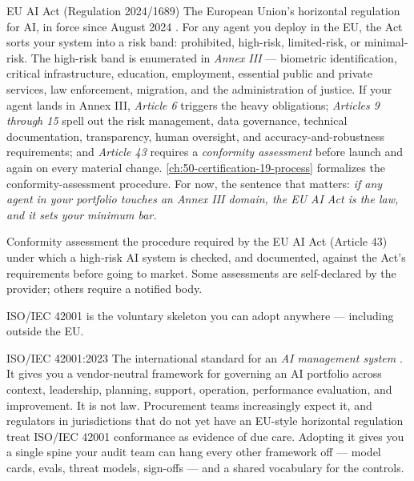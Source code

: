 \begin{TNinpractice}{EU AI Act (Regulation 2024/1689)} The European Union's horizontal regulation for AI, in force since August 2024 \citep{euAIact2024}. For any agent you deploy in the EU, the Act sorts your system into a risk band: prohibited, high-risk, limited-risk, or minimal-risk. The high-risk band is enumerated in \textit{Annex III} --- biometric identification, critical infrastructure, education, employment, essential public and private services, law enforcement, migration, and the administration of justice. If your agent lands in Annex III, \textit{Article 6} triggers the heavy obligations; \textit{Articles 9 through 15} spell out the risk management, data governance, technical documentation, transparency, human oversight, and accuracy-and-robustness requirements; and \textit{Article 43} requires a \textit{conformity assessment} before launch and again on every material change. \autoref{ch:50-certification-19-process} formalizes the conformity-assessment procedure. For now, the sentence that matters: \textit{if any agent in your portfolio touches an Annex III domain, the EU AI Act is the law, and it sets your minimum bar.} \end{TNinpractice}

\begin{TNdefinition}{Conformity assessment} the procedure required by the EU AI Act (Article 43) under which a high-risk AI system is checked, and documented, against the Act's requirements before going to market. Some assessments are self-declared by the provider; others require a notified body. \end{TNdefinition}

ISO/IEC 42001 is the voluntary skeleton you can adopt anywhere --- including outside the EU.

\begin{TNinpractice}{ISO/IEC 42001:2023} The international standard for an \textit{AI management system} \citep{iso-iec-42001}. It gives you a vendor-neutral framework for governing an AI portfolio across context, leadership, planning, support, operation, performance evaluation, and improvement. It is not law. Procurement teams increasingly expect it, and regulators in jurisdictions that do not yet have an EU-style horizontal regulation treat ISO/IEC 42001 conformance as evidence of due care. Adopting it gives you a single spine your audit team can hang every other framework off --- model cards, evals, threat models, sign-offs --- and a shared vocabulary for the controls. \end{TNinpractice}

